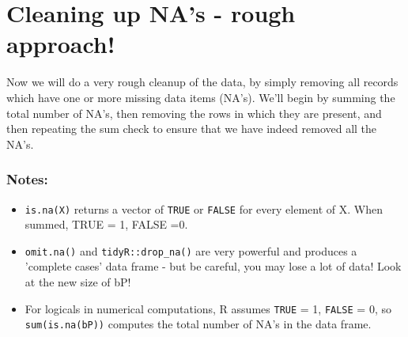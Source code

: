 \documentclass[titlepage]{book}\usepackage{knitr}
\begin{document}
\section{Cleaning up NA's - rough approach!}

Now we will do a very rough cleanup of the data, by simply removing all records which have one or more missing data items (NA's). We'll begin by summing the total number of NA's, then removing the rows in which they are present, and then repeating the sum check to ensure that we have indeed removed all the NA's.

\begin{knitrout}
\color{fgcolor}
\end{knitrout}

\subsubsection{Notes:}

\begin{itemize} 

\item{\texttt{is.na(X)} returns a vector of \texttt{TRUE} or \texttt{FALSE} for every element of X. When summed, TRUE = 1, FALSE =0.}

\item{\texttt{omit.na()} and \texttt{tidyR::drop\_na()} are very powerful and produces a 'complete cases' data frame - but be careful, you may lose a lot of data!  Look at the new size of bP!}

\item{For logicals in numerical computations, R assumes \texttt{TRUE} = 1, \texttt{FALSE} = 0, so \texttt{sum(is.na(bP))} computes the total number of NA's in the data frame.}
\end{itemize}
\end{document}
